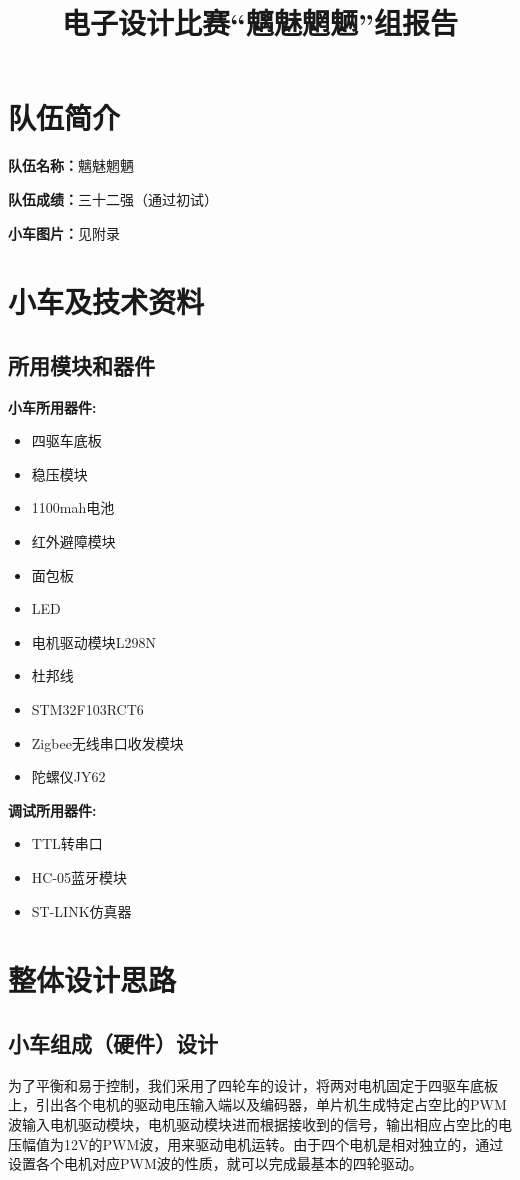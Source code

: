 \documentclass[UTF8]{ctexart}
\begin{document}
\title{电子设计比赛“魑魅魍魉”组报告}
\maketitle

\tableofcontents
\newpage
\section{队伍简介}
\textbf{队伍名称：}魑魅魍魉

\textbf{队伍成绩：}三十二强（通过初试）

\textbf{小车图片：}见附录
\section{小车及技术资料}
\subsection{所用模块和器件}
\textbf{小车所用器件:}
\begin{itemize}
\item 四驱车底板
\item 稳压模块
\item 1100mah电池
\item 红外避障模块
\item 面包板
\item LED
\item 电机驱动模块L298N
\item 杜邦线
\item STM32F103RCT6
\item Zigbee无线串口收发模块
\item 陀螺仪JY62
\end{itemize}
\textbf{调试所用器件:}
\begin{itemize}
\item TTL转串口
\item HC-05蓝牙模块
\item ST-LINK仿真器
\end{itemize}
\section{整体设计思路}
\subsection{小车组成（硬件）设计}
为了平衡和易于控制，我们采用了四轮车的设计，将两对电机固定于四驱车底板上，引出各个电机的驱动电压输入端以及编码器，单片机生成特定占空比的PWM波输入电机驱动模块，电机驱动模块进而根据接收到的信号，输出相应占空比的电压幅值为12V的PWM波，用来驱动电机运转。由于四个电机是相对独立的，通过设置各个电机对应PWM波的性质，就可以完成最基本的四轮驱动。
\end{document}
